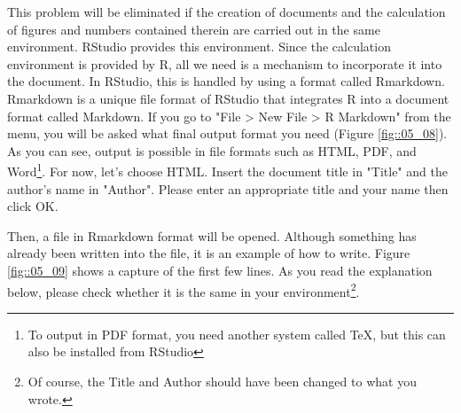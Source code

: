 \documentclass{ltjsbook}
\begin{document}
This problem will be eliminated if the creation of documents and the calculation of figures and numbers contained therein are carried out in the same environment. RStudio provides this environment. Since the calculation environment is provided by R, all we need is a mechanism to incorporate it into the document. In RStudio, this is handled by using a format called Rmarkdown. Rmarkdown is a unique file format of RStudio that integrates R into a document format called Markdown. If you go to "File > New File > R Markdown" from the menu, you will be asked what final output format you need (Figure \ref{fig::05_08}). As you can see, output is possible in file formats such as HTML, PDF, and Word\footnote{To output in PDF format, you need another system called TeX, but this can also be installed from RStudio}. For now, let's choose HTML. Insert the document title in "Title" and the author's name in "Author". Please enter an appropriate title and your name then click OK.






Then, a file in Rmarkdown format will be opened. Although something has already been written into the file, it is an example of how to write. Figure \ref{fig::05_09} shows a capture of the first few lines. As you read the explanation below, please check whether it is the same in your environment\footnote{Of course, the Title and Author should have been changed to what you wrote.}.
\end{document}

